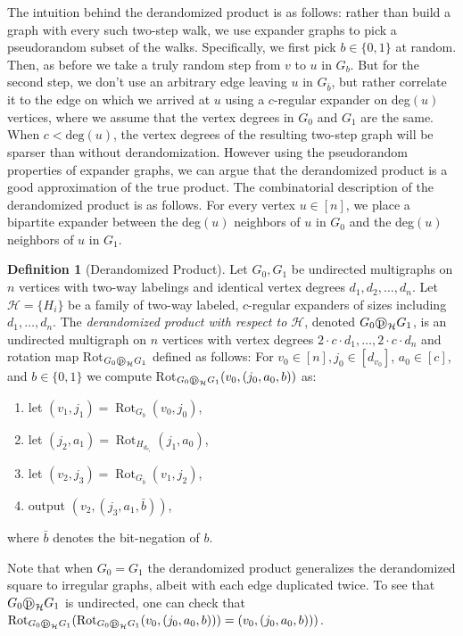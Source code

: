 \documentclass[11pt]{article}
\numberwithin{equation}{section}
\theoremstyle{definition}
\newtheorem{definition}[theorem]{Definition}
\theoremstyle{plain}
\newcommand{\dpr}{\text{\textcircled{p}}_{\mathcal{H}}}
\numberwithin{myalgctr}{section}
\theoremstyle{named}
\begin{document}
The intuition behind the derandomized product is as follows: rather than build a graph with every such two-step walk, we use expander graphs to pick a pseudorandom subset of the walks.  Specifically, we first pick $b\in\{0,1\}$ at random. Then, as before we take a truly random step from $v$ to $u$ in $G_b$. But for the second step, we don't use an arbitrary edge leaving $u$ in $G_{\bar{b}}$, but rather correlate it to the edge on which we arrived at $u$ using a $c$-regular expander on deg$(u)$ vertices, where we assume that the vertex degrees in $G_0$ and $G_1$ are the same. When $c<\mathrm{deg}(u)$, the vertex degrees of the resulting two-step graph will be sparser than without derandomization. However using the pseudorandom properties of expander graphs, we can argue that the derandomized product is a good approximation of the true product. The combinatorial description of the derandomized product is as follows. For every vertex $u\in[n]$, we place a bipartite expander between the deg$(u)$ neighbors of $u$ in $G_0$ and the deg$(u)$ neighbors of $u$ in $G_1$.  

\begin{definition}[Derandomized Product]
\label{def:derandproduct}
Let $G_0, G_1$ be undirected multigraphs on $n$ vertices with two-way labelings and identical vertex degrees $d_1,d_2,\ldots,d_n$. Let $\mathcal{H}=\{H_i\}$ be a family of two-way labeled, $c$-regular expanders of sizes including $d_1,\ldots,d_n$. The \emph{derandomized product with respect to $\mathcal{H}$}, denoted $G_0\dpr G_1$, is an undirected multigraph on $n$ vertices with vertex degrees $2\cdot c\cdot d_1,\ldots,2\cdot c\cdot d_n$ and rotation map Rot$_{G_0\dpr G_1}$ defined as follows: For $v_{0}\in[n], j_0\in[d_{v_0}]$, $a_0\in [c]$, and $b\in\{0,1\}$ we compute Rot$_{G_0\dpr G_1}(v_0,(j_0,a_0,b))$ as:
\begin{enumerate}
\item let $(v_1,j_1)=\operatorname{Rot}_{G_b}(v_0,j_0)$,
\item let $(j_2,a_1)=\operatorname{Rot}_{H_{d_{v_{1}}}}(j_1,a_0)$,
\item let $(v_2,j_3)=\operatorname{Rot}_{G_{\bar{b}}}(v_1,j_2)$,
\item output $(v_2,(j_3,a_1,\bar{b}))$,
\end{enumerate}
where $\bar{b}$ denotes the bit-negation of $b$. 
\end{definition}
Note that when $G_0=G_1$ the derandomized product generalizes the derandomized square \cite{RozenmanVa05} to irregular graphs, albeit with each edge duplicated twice. To see that $G_0\dpr G_1$ is undirected, one can check that $\mathrm{Rot}_{G_0\dpr G_1}(\mathrm{Rot}_{G_0\dpr G_1}(v_0,(j_0,a_0,b)))=(v_0,(j_0,a_0,b)))$.
\end{document}
